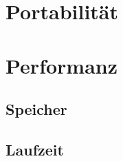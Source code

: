 \documentclass[parskip=full]{scrartcl}
\begin{document}
\section{Portabilität}

\section{Performanz}
\subsection{Speicher}
\subsection{Laufzeit}
\end{document}
